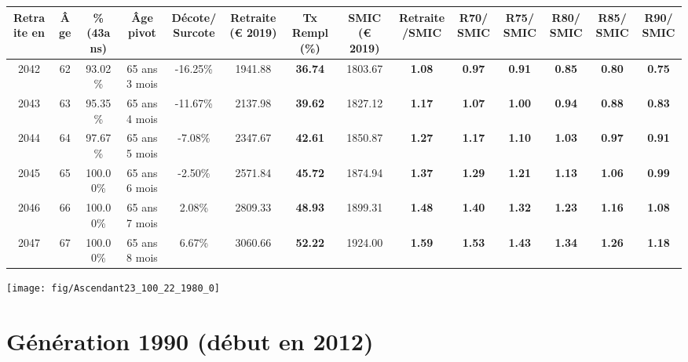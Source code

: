 \begin{adjustbox}{max width=\textwidth} 
\begin{tabular}[htb]{|c|c||c|c|c||c|c||c|c||c|c|c|c|c|} 
\hline 
 Retraite en &  Âge &  \%(43ans) &  Âge pivot &  Décote/Surcote &  Retraite (\euro{} 2019) &  Tx Rempl(\%) &  SMIC (\euro{} 2019) &  Retraite/SMIC &  R70/SMIC &  R75/SMIC &  R80/SMIC &  R85/SMIC &  R90/SMIC \\ 
\hline \hline 
 2042 &  62 &  93.02\% &  65 ans 3 mois &  -16.25\% &  1941.88 &  {\bf 36.74} &  1803.67 &  {\bf 1.08} &  {\bf {\color{red} 0.97}} &  {\bf {\color{red} 0.91}} &  {\bf {\color{red} 0.85}} &  {\bf {\color{red} 0.80}} &  {\bf {\color{red} 0.75}} \\ 
\hline 
 2043 &  63 &  95.35\% &  65 ans 4 mois &  -11.67\% &  2137.98 &  {\bf 39.62} &  1827.12 &  {\bf 1.17} &  {\bf 1.07} &  {\bf 1.00} &  {\bf {\color{red} 0.94}} &  {\bf {\color{red} 0.88}} &  {\bf {\color{red} 0.83}} \\ 
\hline 
 2044 &  64 &  97.67\% &  65 ans 5 mois &  -7.08\% &  2347.67 &  {\bf 42.61} &  1850.87 &  {\bf 1.27} &  {\bf 1.17} &  {\bf 1.10} &  {\bf 1.03} &  {\bf {\color{red} 0.97}} &  {\bf {\color{red} 0.91}} \\ 
\hline 
 2045 &  65 &  100.00\% &  65 ans 6 mois &  -2.50\% &  2571.84 &  {\bf 45.72} &  1874.94 &  {\bf 1.37} &  {\bf 1.29} &  {\bf 1.21} &  {\bf 1.13} &  {\bf 1.06} &  {\bf {\color{red} 0.99}} \\ 
\hline 
 2046 &  66 &  100.00\% &  65 ans 7 mois &  2.08\% &  2809.33 &  {\bf 48.93} &  1899.31 &  {\bf 1.48} &  {\bf 1.40} &  {\bf 1.32} &  {\bf 1.23} &  {\bf 1.16} &  {\bf 1.08} \\ 
\hline 
 2047 &  67 &  100.00\% &  65 ans 8 mois &  6.67\% &  3060.66 &  {\bf 52.22} &  1924.00 &  {\bf 1.59} &  {\bf 1.53} &  {\bf 1.43} &  {\bf 1.34} &  {\bf 1.26} &  {\bf 1.18} \\ 
\hline 
\hline 
\end{tabular} 
\end{adjustbox} 
 
 \vspace{0.1cm} 

 {\hspace{-2.2cm}\texttt{[image: fig/Ascendant23\_100\_22\_1980\_0]}} 

\newpage 
 
\section{Génération 1990 (début en 2012)\label{Ascendant23_100_22_1990_0}} 
 
